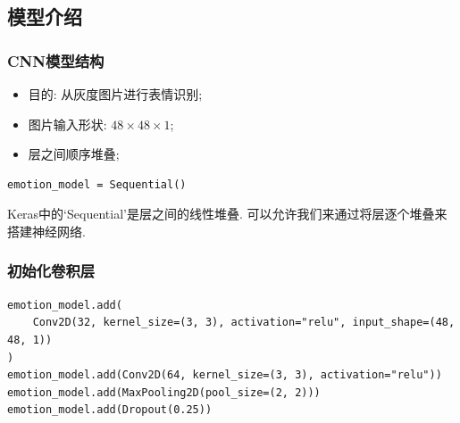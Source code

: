\documentclass{beamer}
\begin{document}
\subsection{模型介绍}
\begin{frame}[fragile]
	\frametitle{CNN模型结构}
	\begin{itemize}
		\item 目的: 从灰度图片进行表情识别;
		\item 图片输入形状: \(48 \times 48 \times 1\);
		\item 层之间顺序堆叠;
	\end{itemize}
	\begin{verbatim}
emotion_model = Sequential()
\end{verbatim}
	Keras中的`Sequential'是层之间的线性堆叠. 可以允许我们来通过将层逐个堆叠来搭建神经网络.
\end{frame}

\begin{frame}[fragile]
	\frametitle{初始化卷积层}
	\begin{verbatim}
emotion_model.add(
    Conv2D(32, kernel_size=(3, 3), activation="relu", input_shape=(48, 48, 1))
)
emotion_model.add(Conv2D(64, kernel_size=(3, 3), activation="relu"))
emotion_model.add(MaxPooling2D(pool_size=(2, 2)))
emotion_model.add(Dropout(0.25))
\end{verbatim}
\end{frame}
\end{document}
